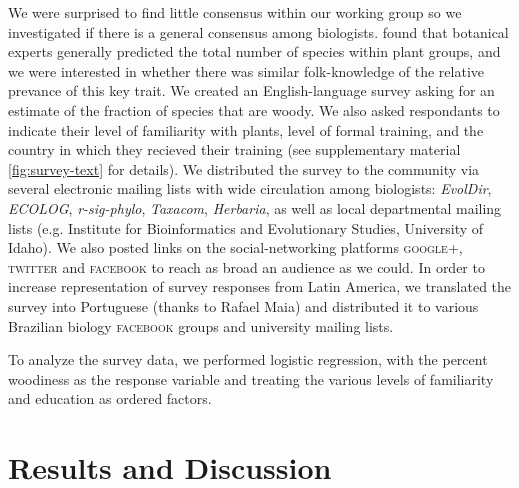 \documentclass[12pt]{article}
\begin{document}
We were surprised to find little consensus within our working group
so we investigated if there is a general consensus among
biologists.
% 
\citet{joppa2010} found that botanical experts generally predicted the
total number of species within plant groups, and we were interested in
whether there was similar folk-knowledge of the relative prevance of
this key trait.
%
We created an English-language survey asking for an estimate of the
fraction of species that are woody.  We also asked respondants to
indicate their level of familiarity with plants, level of formal
training, and the country in which they recieved their training (see
supplementary material \ref{fig:survey-text} for details).
We distributed the survey to the community via several electronic
mailing lists with wide circulation among biologists: \emph{EvolDir},
\emph{ECOLOG}, \emph{r-sig-phylo}, \emph{Taxacom}, \emph{Herbaria}, as
well as local departmental mailing lists (e.g. Institute for
Bioinformatics and Evolutionary Studies, University of Idaho). We also
posted links on the social-networking platforms \textsc{google+},
\textsc{twitter} and \textsc{facebook} to reach as broad an audience
as we could.
In order to increase representation of survey responses from Latin
America, we translated the survey into Portuguese (thanks to Rafael
Maia) and distributed it to various Brazilian biology
\textsc{facebook} groups and university mailing lists.

To analyze the survey data, we performed logistic regression, with the percent woodiness as the response variable \citep[for discussion as to why we used logistic regression, see][]{wartonarcsine} and treating the various levels of familiarity and education as ordered factors.


\section{Results and Discussion}
\end{document}
